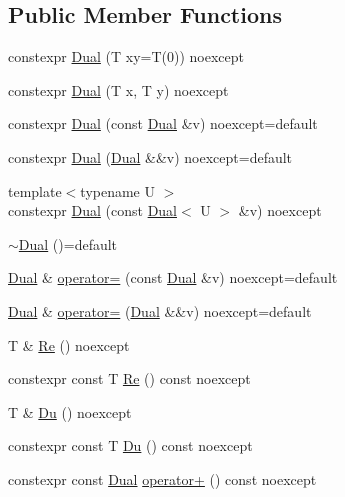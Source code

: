 \subsection*{Public Member Functions}
\begin{DoxyCompactItemize}
\item 
constexpr \mbox{\hyperlink{structmage_1_1_dual_a7ac9dc0e4574c24523c5b65f95e25eb7}{Dual}} (T xy=T(0)) noexcept
\item 
constexpr \mbox{\hyperlink{structmage_1_1_dual_a413d0fe95d8e071dbf232ebd31e19101}{Dual}} (T x, T y) noexcept
\item 
constexpr \mbox{\hyperlink{structmage_1_1_dual_a4d0d8d4ece5e6fd0931b2c775c6e3479}{Dual}} (const \mbox{\hyperlink{structmage_1_1_dual}{Dual}} \&v) noexcept=default
\item 
constexpr \mbox{\hyperlink{structmage_1_1_dual_a23c118e5db0959a97b71ee24ec984542}{Dual}} (\mbox{\hyperlink{structmage_1_1_dual}{Dual}} \&\&v) noexcept=default
\item 
{\footnotesize template$<$typename U $>$ }\\constexpr \mbox{\hyperlink{structmage_1_1_dual_a2d8a99b9d65dd0dea90fbb071fa90864}{Dual}} (const \mbox{\hyperlink{structmage_1_1_dual}{Dual}}$<$ U $>$ \&v) noexcept
\item 
\mbox{\hyperlink{structmage_1_1_dual_a366d044291e2f14f65c0b7e3b98e7642}{$\sim$\+Dual}} ()=default
\item 
\mbox{\hyperlink{structmage_1_1_dual}{Dual}} \& \mbox{\hyperlink{structmage_1_1_dual_a042226b70272f46ec28dcb4cd51be3f8}{operator=}} (const \mbox{\hyperlink{structmage_1_1_dual}{Dual}} \&v) noexcept=default
\item 
\mbox{\hyperlink{structmage_1_1_dual}{Dual}} \& \mbox{\hyperlink{structmage_1_1_dual_af584cd034bb1ab0e17746d3d2ab6f49d}{operator=}} (\mbox{\hyperlink{structmage_1_1_dual}{Dual}} \&\&v) noexcept=default
\item 
T \& \mbox{\hyperlink{structmage_1_1_dual_a4d4a35abe926e10556d7db5e2faa9207}{Re}} () noexcept
\item 
constexpr const T \mbox{\hyperlink{structmage_1_1_dual_a106aab088b16ef1dc5e9363f44c9a2d1}{Re}} () const noexcept
\item 
T \& \mbox{\hyperlink{structmage_1_1_dual_a2c45ed99742d46e2c837a302ebf72d06}{Du}} () noexcept
\item 
constexpr const T \mbox{\hyperlink{structmage_1_1_dual_ae4d1ed542602eb767a17ae3619c2fb4b}{Du}} () const noexcept
\item 
constexpr const \mbox{\hyperlink{structmage_1_1_dual}{Dual}} \mbox{\hyperlink{structmage_1_1_dual_ad4d250c779d736134e11130967e0cf1c}{operator+}} () const noexcept

\end{DoxyCompactItemize}
